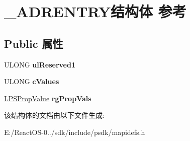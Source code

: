 \hypertarget{struct___a_d_r_e_n_t_r_y}{}\section{\+\_\+\+A\+D\+R\+E\+N\+T\+R\+Y结构体 参考}
\label{struct___a_d_r_e_n_t_r_y}
\subsection*{Public 属性}
\begin{DoxyCompactItemize}
\item 
\mbox{\label{struct___a_d_r_e_n_t_r_y_aec465056bbd80339fbcd9b0f139a63dd}} 
U\+L\+O\+NG {\bfseries ul\+Reserved1}
\item 
\mbox{\label{struct___a_d_r_e_n_t_r_y_ad7c010d30b4759d5fcad870c2051d63b}} 
U\+L\+O\+NG {\bfseries c\+Values}
\item 
\mbox{\label{struct___a_d_r_e_n_t_r_y_a1112ecf17f0ccb907cb4d44d712668f7}} 
\hyperlink{struct___s_prop_value}{L\+P\+S\+Prop\+Value} {\bfseries rg\+Prop\+Vals}
\end{DoxyCompactItemize}


该结构体的文档由以下文件生成\+:\begin{DoxyCompactItemize}
\item 
E\+:/\+React\+O\+S-\/0../sdk/include/psdk/mapidefs.\+h\end{DoxyCompactItemize}

